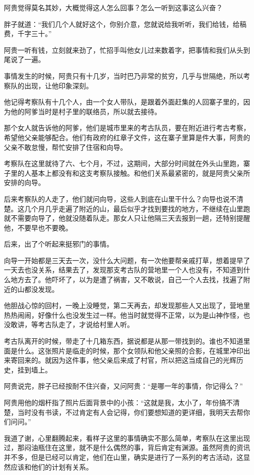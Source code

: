 阿贵觉得莫名其妙，大概觉得这人怎么回事？怎么一听到这事这么兴奋？

胖子就道：“我们几个人就好这个，你别介意，您就说给我听听，我们给钱，给稿费，千字三十。”

阿贵一听有钱，立刻就来劲了，忙招手叫他女儿过来数着字，把事情和我们从头到尾说了一遍。

事情发生的时候，阿贵只有十几岁，当时巴乃非常的贫穷，几乎与世隔绝，所以考察队的出现，让他印象深刻。

他记得考察队有十几个人，由一个女人带队，是跟着外面赶集的人回寨子里的，因为他的阿爹当时是村子里的联络员，所以就去接待。

那个女人就告诉他的阿爹，他们是城市里来的考古队员，要在附近进行考古考察，希望他父亲能够配合。他们有政府的红章子文件，这在寨子里算是件大事，阿贵的父亲不敢怠慢，帮忙安排了住宿和向导。

考察队在这里就待了六、七个月，不过，这期间，大部分时间就在外头山里跑，寨子里的人基本上都没有和这支考察队接触。和他们关系最紧密的，就是阿贵父亲所安排的向导。

后来考察队的人走了，他们就问向导，这些人到底在山里干什么？向导也说不清楚。这几个月几乎走遍了附近的山，最后似乎才找到要找的地方，不继续在山里跑就不需要向导了，他就没随着队走。那女人只让他隔三天去报到一趟，还特别提醒他，不要早也不要晚。

后来，出了个听起来挺邪门的事情。

向导一开始都是三天去一次，没什么大问题，有一次他要帮亲戚打草，想着提早了一天去也没关系，结果去了，发现那支考古队的营地里一个人也没有，不知道到什么地方去了。他吓坏了，以为是遭了祸害，又不敢说，自己一个人去找，找遍了附近的山都没发现。

他胆战心惊的回村，一晚上没睡觉，第二天再去，却发现那些人又出现了，营地里热热闹闹，好像什么也没发生过一样。他当时就觉得不正常，以为是山神作怪，也没敢讲，等考古队走了，才说给村里人听。

考古队离开的时候，带走了十几箱东西，据说都是从那一带找到的。谁也不知道里面是什么。这张照片是临走的时候，那个女领队和他父亲照的合影，在城里冲印出来寄回来的。就因为这件事，他父亲后来成了村官，所以把这当成自己的光辉历史，挂到墙上。

阿贵说完，胖子已经按耐不住兴奋，又问阿贵：“是哪一年的事情，你记得么？”

阿贵用他的烟杆指了照片后面背景中的小孩：“这就是我，太小了，年份搞不清楚，当时没有书读，不过肯定有人会记得，你们要想知道的更详细，我明天去帮你们问问。”

我道了谢，心里翻腾起来，看样子这里的事情确实不那么简单，考察队在这里出现过，那闷油瓶住在这里，就不是什么偶然的事，背后肯定有渊源。虽然阿贵的资讯并不多，但是已经可以肯定，他们在山里，确实是进行了一系列的考古活动，这显然应该和他们的计划有关系。

